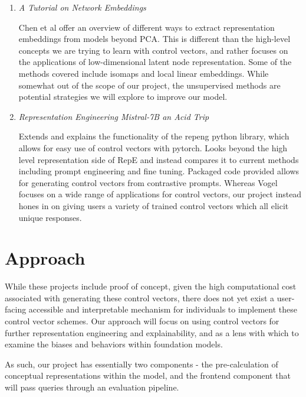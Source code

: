 \documentclass[11pt,a4paper]{article}
\begin{document}
\begin{enumerate}
\item \emph{A Tutorial on Network Embeddings}~\cite{chen2018network}

Chen et al offer an overview of different ways to extract representation embeddings from models beyond PCA. This is different than the high-level concepts we are trying to learn with control vectors, and rather focuses on the applications of low-dimensional latent node representation. Some of the methods covered include isomaps and local linear embeddings. While somewhat out of the scope of our project, the unsupervised methods are potential strategies we will explore to improve our model.

\item \emph{Representation Engineering Mistral-7B an Acid Trip}~\cite{vogel2024repeng}

Extends and explains the functionality of the repeng python library, which allows for easy use of control vectors with pytorch. Looks beyond the high level representation side of RepE and instead compares it to current methods including prompt engineering and fine tuning. Packaged code provided allows for generating control vectors from contrastive prompts. Whereas Vogel focuses on a wide range of applications for control vectors, our project instead hones in on giving users a variety of trained control vectors which all elicit unique responses. 

\end{enumerate}


\section{Approach}
While these projects include proof of concept, given the high computational cost associated with generating these control vectors, there does not yet exist a user-facing accessible and interpretable mechanism for individuals to implement these control vector schemes. Our approach will focus on using control vectors for further representation engineering and explainability, and as a lens with which to examine the biases and behaviors within foundation models. 

As such, our project has essentially two components - the pre-calculation of conceptual representations within the model, and the frontend component that will pass queries through an evaluation pipeline.
\end{document}
